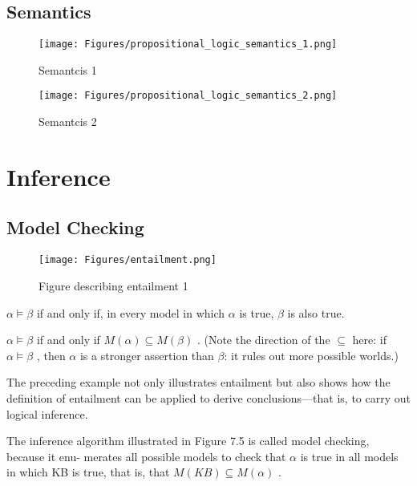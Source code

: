 \subsection{Semantics}

\begin{figure}[H]
    \centering
    \texttt{[image: Figures/propositional\_logic\_semantics\_1.png]}
    \caption{Semantcis 1}
    \label{fig:S1}
\end{figure}

\begin{figure}[H]
    \centering
    \texttt{[image: Figures/propositional\_logic\_semantics\_2.png]}
    \caption{Semantcis 2}
    \label{fig:S2}
\end{figure}













\section{Inference}
\subsection{Model Checking}

\begin{figure}[H]
    \centering
    \texttt{[image: Figures/entailment.png]}
    \caption{Figure describing entailment 1}
    \label{fig:entailment}
\end{figure}

$\alpha \models \beta$  if and only if, in every model in which $\alpha$ is true, $\beta$ is also true.

$\alpha \models \beta$  if and only if $M (\alpha) \subseteq M (\beta)$ .
(Note the direction of the $\subseteq$ here: if $\alpha \models \beta$ , then $\alpha$ is a stronger assertion than $\beta$: it rules out more possible worlds.)

The preceding example not only illustrates entailment but also shows how the definition of entailment can be applied to derive conclusions—that is, to carry out logical inference.

The inference algorithm illustrated in Figure 7.5 is called model checking, because it enu-
merates all possible models to check that $\alpha$ is true in all models in which KB is true, that is,
that  $M (KB) \subseteq M (\alpha)$ .

